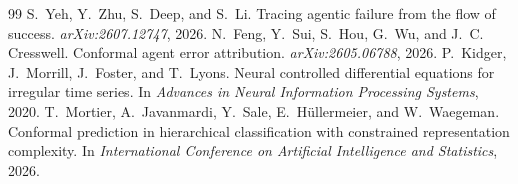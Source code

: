 \documentclass[11pt]{article}
\theoremstyle{definition}
\begin{document}
\begin{thebibliography}{99}
 S.~Yeh, Y.~Zhu, S.~Deep, and S.~Li. Tracing agentic failure from the flow of success. \emph{arXiv:2607.12747}, 2026.
 N.~Feng, Y.~Sui, S.~Hou, G.~Wu, and J.~C. Cresswell. Conformal agent error attribution. \emph{arXiv:2605.06788}, 2026.
 P.~Kidger, J.~Morrill, J.~Foster, and T.~Lyons. Neural controlled differential equations for irregular time series. In \emph{Advances in Neural Information Processing Systems}, 2020.
 T.~Mortier, A.~Javanmardi, Y.~Sale, E.~H\"ullermeier, and W.~Waegeman. Conformal prediction in hierarchical classification with constrained representation complexity. In \emph{International Conference on Artificial Intelligence and Statistics}, 2026.
\end{thebibliography}
\end{document}
